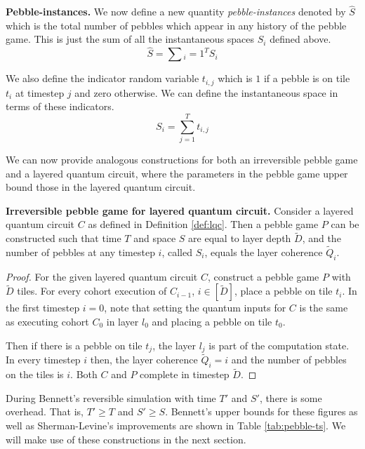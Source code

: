 \begin{definition}{\textbf{Pebble-instances.}}
We now define a new quantity \emph{pebble-instances} denoted by
$\hat{S}$ which is the total number of pebbles which appear in
any history of the pebble game. This is just the sum of all the
instantaneous spaces $S_i$ defined above.
\begin{equation}
\hat{S} = \sum{_i=1}^T S_i
\end{equation}

We also define the indicator random variable $t_{i,j}$ which is $1$
if a pebble is on tile $t_i$ at timestep $j$ and zero otherwise.
We can define the instantaneous space in terms of these indicators.
\begin{equation}
S_i = \sum_{j=1}^T t_{i,j}
\end{equation}
\end{definition}

We can now provide analogous constructions for both an irreversible pebble game
and a layered quantum circuit, where the parameters in the pebble game
upper bound those in the layered quantum circuit.

\begin{proposition}{\textbf{Irreversible pebble game for layered quantum circuit.}}
Consider a layered quantum circuit $C$
as defined in 
Definition \ref{def:lqc}. Then a pebble game $P$ can be constructed such that
time $T$ and space $S$ are equal to layer depth $\tilde{D}$,
and the number of pebbles at any timestep $i$, called $S_i$, equals the
layer coherence $\tilde{Q}_i$.
\label{thm:ipg-lqc}
\end{proposition}

\begin{proof}
For the given layered quantum circuit $C$, construct a pebble game $P$
with $\tilde{D}$ tiles. For every cohort execution of $C_{i-1}$, $i \in [\tilde{D}]$,
place a pebble on tile $t_i$.
In the first timestep $i=0$, note that setting the quantum inputs for $C$
is the same as executing cohort $C_0$ in layer $l_0$ and 
placing a pebble on tile $t_0$.

Then if there is a pebble on tile $t_j$,
the layer $l_j$ is part of the computation state. In every timestep $i$ then, the layer coherence
$\tilde{Q}_i = i$ and the number of pebbles on the tiles is $i$.
Both $C$ and $P$ complete in timestep $\tilde{D}$.
\end{proof}

During Bennett's reversible
simulation with time $T'$ and $S'$, there is some overhead. That is,
$T' \ge T$ and $S' \ge S$. Bennett's upper bounds for these figures
as well as Sherman-Levine's improvements \cite{Levine1990} are shown
in Table \ref{tab:pebble-ts}. We will make use of these constructions in
the next section.

